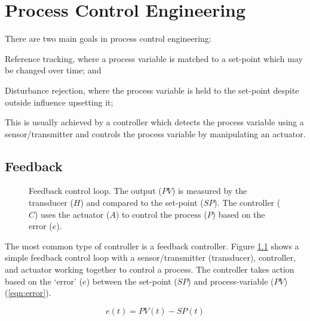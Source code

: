 \chapter{Process Control Engineering}
\label{Chapter:Controls}

There are two main goals in process control engineering:
\begin{enumerate*}
    \item Reference tracking, where a process variable is matched to a set-point which may be changed over time; and 
    \item Disturbance rejection, where the process variable is held to the set-point despite outside influence upsetting it;
\end{enumerate*}
This is usually achieved by a controller which detects the process variable using a sensor/transmitter and controls the process variable by manipulating an actuator. 

\section{Feedback}
\begin{figure}[h!]
    \centering
    
    \caption[Feedback control loop]{Feedback control loop. The output ($PV$) is measured by the transducer ($H$) and compared to the set-point ($SP$). The controller ($C$) uses the actuator ($A$) to control the process ($P$) based on the error ($e$).}
    \label{fig:tikz_feedback}
\end{figure}

The most common type of controller is a feedback controller. Figure \ref{fig:tikz_feedback} shows a simple feedback control loop with a sensor/transmitter (\ie transducer), controller, and actuator working together to control a process. The controller takes action based on the `error' ($e$) between the set-point ($SP$) and process-variable ($PV$) (\ref{eqn:error}).

\begin{equation}\label{eqn:error}
    e(t) = PV(t) - SP(t)
\end{equation}

